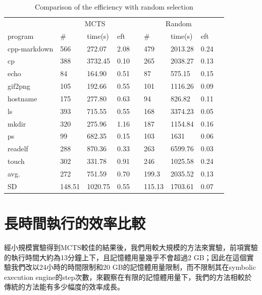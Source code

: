 \documentclass[12pt,a4paper,oneside]{book}
\begin{document}
\begin{table}[htbp]
\centering
\caption{Comparison of the efficiency with random selection}
\label{testRandomSeletion}
\begin{tabular}{@{}lllllllll@{}} \toprule
             & \multicolumn{3}{c}{MCTS} & \phantom{abc} & \multicolumn{3}{c}{Random} \\ \cmidrule{2-4} \cmidrule{6-8}
program      & \#   & time(s)   & eft   & & \#   & time(s) & eft  \\ \midrule
cpp-markdown & 566    & 272.07 & 2.08 & & 479    &2013.28& 0.24     \\
cp           & 388    & 3732.45& 0.10 & & 265    &2038.27& 0.13     \\
echo         &  84    & 164.90 & 0.51 & &  87    & 575.15& 0.15     \\
gif2png      & 105    & 192.66 & 0.55 & & 101    &1116.26& 0.09     \\ 
hostname     & 175    & 277.80 & 0.63 & &  94    & 826.82& 0.11     \\
ls           & 393    & 715.55 & 0.55 & & 168    &3374.23& 0.05     \\
mkdir        & 320    & 275.96 & 1.16 & & 187    &1154.84& 0.16     \\
ps           &  99    & 682.35 & 0.15 & & 103    &1631   & 0.06     \\
readelf      & 288    & 870.36 & 0.33 & & 263    &6599.76& 0.03     \\
touch        & 302    & 331.78 & 0.91 & & 246    &1025.58& 0.24     \\ \hline
avg.         & 272    & 751.59 & 0.70 & & 199.3  &2035.52& 0.13     \\
SD           & 148.51 &1020.75 & 0.55 & & 115.13 &1703.61& 0.07     \\ \bottomrule
\end{tabular}
\end{table}

\section{長時間執行的效率比較}

經小規模實驗得到MCTS較佳的結果後，我們用較大規模的方法來實驗，前項實驗的執行時間大約為13分鐘上下，且記憶體用量幾乎不會超過2 GB；因此在這個實驗我們改以24小時的時間限制和20 GB的記憶體用量限制，而不限制其在symbolic execution engine的step次數，來觀察在有限的記憶體用量下，我們的方法相較於傳統的方法能有多少幅度的效率成長。
\end{document}
